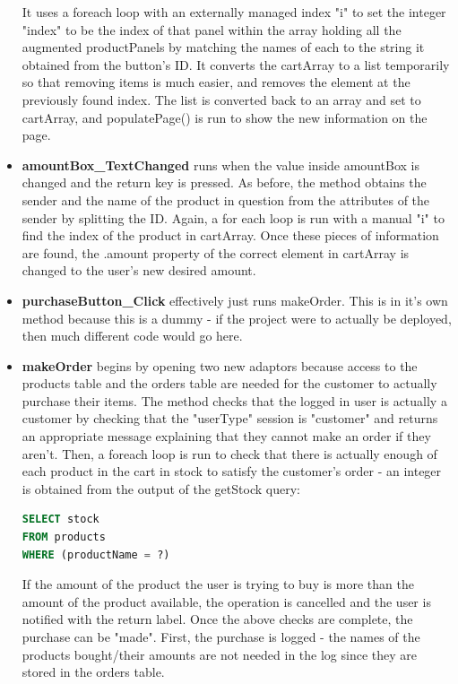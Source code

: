 ﻿\documentclass{article}
\begin{document}
\begin{itemize}
        It uses a foreach loop with an externally managed index "i" to set the integer "index" to be the index of that panel within the array holding all the augmented productPanels by matching the names of each to the string it obtained from the button's ID.
        It converts the cartArray to a list temporarily so that removing items is much easier, and removes the element at the previously found index.
        The list is converted back to an array and set to cartArray, and populatePage() is run to show the new information on the page.
        \item \textbf{amountBox\_TextChanged} runs when the value inside amountBox is changed and the return key is pressed.
        As before, the method obtains the sender and the name of the product in question from the attributes of the sender by splitting the ID.
        Again, a for each loop is run with a manual "i" to find the index of the product in cartArray.
        Once these pieces of information are found, the .amount property of the correct element in cartArray is changed to the user's new desired amount.
        \item \textbf{purchaseButton\_Click} effectively just runs makeOrder.
        This is in it's own method because this is a dummy - if the project were to actually be deployed, then much different code would go here.
        \item \textbf{makeOrder} begins by opening two new adaptors because access to the products table and the orders table are needed for the customer to actually purchase their items.
        The method checks that the logged in user is actually a customer by checking that the "userType" session is "customer" and returns an appropriate message explaining that they cannot make an order if they aren't.
        Then, a foreach loop is run to check that there is actually enough of each product in the cart in stock to satisfy the customer's order - an integer is obtained from the output of the getStock query:
        \begin{lstlisting}[language=SQL]
SELECT stock
FROM products
WHERE (productName = ?)
        \end{lstlisting}
        If the amount of the product the user is trying to buy is more than the amount of the product available, the operation is cancelled and the user is notified with the return label.
        Once the above checks are complete, the purchase can be "made".
        First, the purchase is logged - the names of the products bought/their amounts are not needed in the log since they are stored in the orders table.

\end{itemize}
\end{document}
